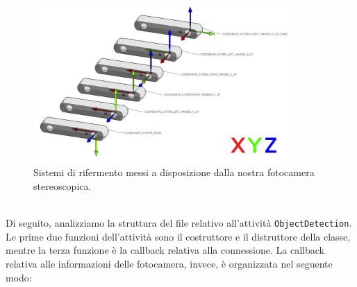 \documentclass{report}
\begin{document}
\begin{figure}[h!]
	\centering
	\includegraphics[height=6cm]{immagini/CoordinateSystem}
	\caption{Sistemi di rifermento messi a disposizione dalla nostra fotocamera stereoscopica.}
	\label{figura:sdrZED}
\end{figure}
\\\indent Di seguito, analizziamo la struttura del file relativo all'attività \texttt{ObjectDetection}. Le prime due funzioni dell'attività sono il costruttore e il distruttore della classe, mentre la terza funzione è la callback relativa alla connessione. La callback relativa alle informazioni delle fotocamera, invece, è organizzata nel seguente modo: 
\end{document}
